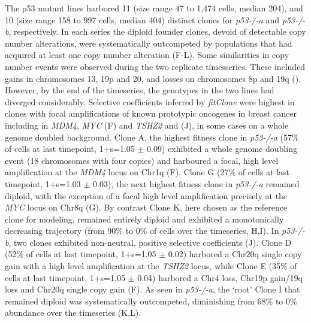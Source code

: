 The p53 mutant lines harbored 11 (size range 47 to 1,474 cells, median 204), and 10 (size range 158 to 997 cells, median 404) distinct clones for \textit{p53-/-a} and \textit{p53-/-b}, respectively. In each series the diploid founder clones, devoid of detectable copy number alterations, were systematically outcompeted by populations that had acquired at least one copy number alteration (F-L).  Some similarities in copy number events were observed during the two replicate timesseries. These included gains in chromosomes 13, 19p and 20, and losses on chromosomes 8p and 19q (). However, by the end of the timeseries, the genotypes in the two lines had diverged considerably. Selective coefficients inferred by \textit{fitClone} were highest in clones with focal amplifications of known prototypic oncogenes in breast cancer\cite{Curtis2012-kq,Shah2012-vx,Nik-Zainal2016-tu,Cancer_Genome_Atlas_Network2012-ug} including in \textit{MDM4}, \textit{MYC} (F) and \textit{TSHZ2} and (J), in some cases on a whole genome doubled background. Clone A, the highest fitness clone in \textit{p53-/-a} (57\% of cells at last timepoint, 1+s=1.05 $\pm$ 0.09) exhibited a whole genome doubling event (18 chromosomes with four copies) and harboured a focal, high level amplification at the \textit{MDM4} locus on Chr1q (F). Clone G (27\% of cells at last timepoint, 1+s=1.03 $\pm$ 0.03), the next highest fitness clone in \textit{p53-/-a} remained diploid, with the exception of a focal high level amplification precisely at the \textit{MYC} locus on Chr8q (G). By contrast Clone K, here chosen as the reference clone for modeling, remained entirely diploid and exhibited a monotonically decreasing trajectory (from 90\% to 0\% of cells over the timeseries, H,I). In \textit{p53-/-b}, two clones exhibited non-neutral, positive selective coefficients (J). Clone D (52\% of cells at last timepoint,  1+s=1.05 $\pm$ 0.02) harbored a Chr20q single copy gain with a high level amplification at the \textit{TSHZ2} locus, while Clone E (35\% of cells at last timepoint, 1+s=1.05 $\pm$ 0.04) harbored a Chr4 loss, Chr19p gain/19q loss and Chr20q single copy gain (F). As seen in \textit{p53-/-a}, the ‘root’ Clone I that remained diploid was systematically outcompeted, diminishing from 68\% to 0\% abundance over the timeseries (K,L). 

